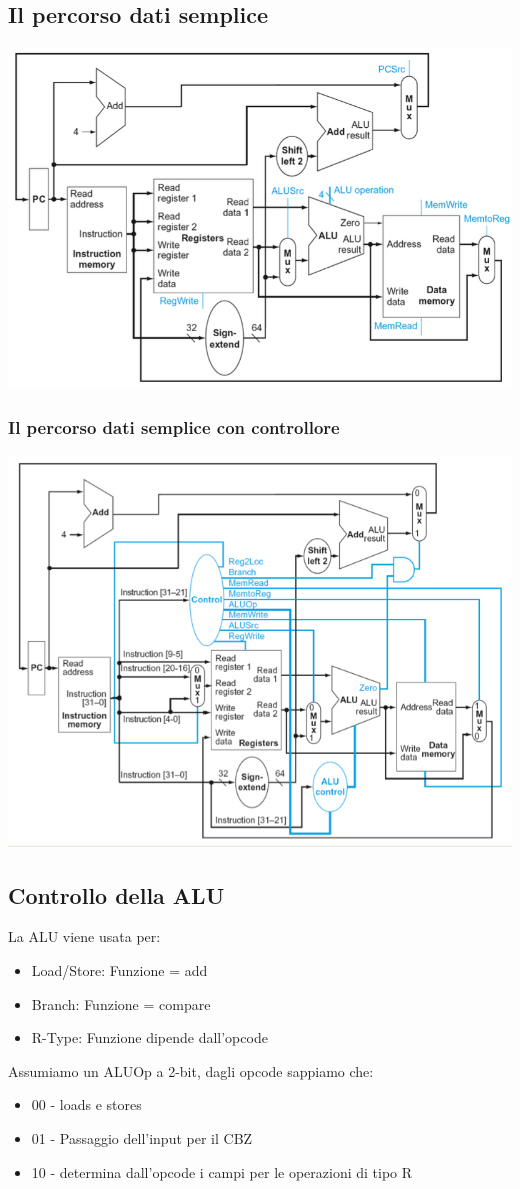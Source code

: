 \documentclass[12pt,a4paper]{article}
\begin{document}
\subsection{Il percorso dati semplice}
\begin{center}
\includegraphics[width=0.7\columnwidth]{img/datapath.png}
\end{center}

\subsubsection{Il percorso dati semplice con controllore}
\begin{center}
\includegraphics[width=0.7\columnwidth]{img/datapath_control.png}
\end{center}

\subsection{Controllo della ALU}
La ALU viene usata per:
\begin{itemize}
\item Load/Store: Funzione = add
\item Branch: Funzione = compare
\item R-Type: Funzione dipende dall'opcode
\end{itemize}
Assumiamo un ALUOp a 2-bit, dagli opcode sappiamo che:
\begin{itemize}
\item 00 - loads e stores
\item 01 - Passaggio dell'input per il CBZ
\item 10 - determina dall'opcode i campi per le operazioni di tipo R
\end{itemize}
\end{document}
